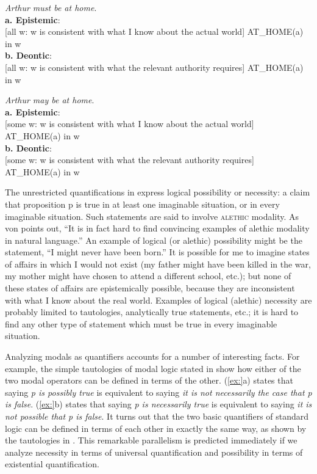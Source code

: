 \ea
\textit{Arthur must be at home}.\\
\textbf{a. Epistemic}:\\
{}[all w: w is consistent with what I know about the actual world] AT\_HOME(a) in w\\
\textbf{b. Deontic}:\\
{}[all w: w is consistent with what the relevant authority requires] AT\_HOME(a) in w
\z

\ea
\textit{Arthur may be at home}.\\
\textbf{a. Epistemic}:\\
{}[some w: w is consistent with what I know about the actual world] AT\_HOME(a) in w\\
\textbf{b. Deontic}:\\
{}[some w: w is consistent with what the relevant authority requires] AT\_HOME(a) in w
\z


The unrestricted quantifications in  express logical possibility or necessity: a claim that proposition p is true in at least one imaginable situation, or in every imaginable situation. Such statements are said to involve \textsc{alethic} modality. As von \citet{Fintel2006} points out, “It is in fact hard to find convincing examples of alethic modality in natural language.” An example of logical (or alethic) possibility might be the statement, “I might never have been born.” It is possible for me to imagine states of affairs in which I would not exist (my father might have been killed in the war, my mother might have chosen to attend a different school, etc.); but none of these states of affairs are epistemically possible, because they are inconsistent with what I know about the real world. Examples of logical (alethic) necessity are probably limited to tautologies, analytically true statements, etc.; it is hard to find any other type of statement which must be true in every imaginable situation.



Analyzing modals as quantifiers accounts for a number of interesting facts. For example, the simple tautologies of modal logic stated in  show how either of the two modal operators can be defined in terms of the other. (\ref{ex:}a) states that saying \textit{p is possibly true} is equivalent to saying \textit{it is not necessarily the case that p is false}. (\ref{ex:}b) states that saying \textit{p is necessarily true} is equivalent to saying \textit{it is not possible that p is false}. It turns out that the two basic quantifiers of standard logic can be defined in terms of each other in exactly the same way, as shown by the tautologies in . This remarkable parallelism is predicted immediately if we analyze necessity in terms of universal quantification and possibility in terms of existential quantification.


